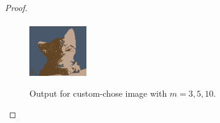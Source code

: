 \documentclass[12pt]{article}
\newcommand{\1}{\mathbf{1}}
\begin{document}
{\begin{itemize}
\begin{proof}
\begin{align*}
\end{align*}
    \begin{figure}[htbp]
    \centering
    {
    \includegraphics[width=0.22\textwidth]{../figures/cat-part3-3.png}
    }
    \caption{Output for custom-chose image with $m=3,5,10$.\label{fig:part3-2}}
    \end{figure}
  \end{proof}
\end{itemize}

\par}
\end{document}

